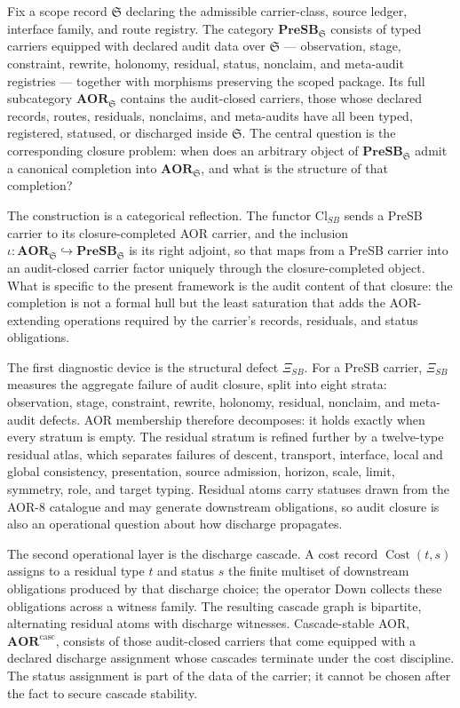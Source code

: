 \documentclass[11pt]{article}
\DeclareMathOperator{\Cost}{Cost}
\newcommand{\PreSB}{\mathbf{PreSB}}
\newcommand{\AOR}{\mathbf{AOR}}
\newcommand{\CascadeStableAOR}{\mathbf{AOR}^{\mathrm{casc}}}
\newcommand{\ClSB}{\mathrm{Cl}_{SB}}
\newcommand{\XiSB}{\Xi_{SB}}
\theoremstyle{definition}
\begin{document}
Fix a scope record \(\mathfrak S\) declaring the admissible
carrier-class, source ledger, interface family, and route registry.
The category \(\PreSB_{\mathfrak S}\) consists of typed carriers
equipped with declared audit data over \(\mathfrak S\) --- observation,
stage, constraint, rewrite, holonomy, residual, status, nonclaim, and
meta-audit registries --- together with morphisms preserving the
scoped package.  Its full subcategory \(\AOR_{\mathfrak S}\) contains
the audit-closed carriers, those whose declared records, routes,
residuals, nonclaims, and meta-audits have all been typed, registered,
statused, or discharged inside \(\mathfrak S\).  The central question
is the corresponding closure problem: when does an arbitrary object of
\(\PreSB_{\mathfrak S}\) admit a canonical completion into
\(\AOR_{\mathfrak S}\), and what is the structure of that completion?

The construction is a categorical reflection.  The functor \(\ClSB\)
sends a PreSB carrier to its closure-completed AOR carrier, and the
inclusion \(\iota:\AOR_{\mathfrak S}\hookrightarrow
\PreSB_{\mathfrak S}\) is its right adjoint, so that maps from a
PreSB carrier into an audit-closed carrier factor uniquely through the
closure-completed object.  What is specific to the present framework
is the audit content of that closure: the completion is not a formal
hull but the least saturation that adds the AOR-extending operations
required by the carrier's records, residuals, and status obligations.

The first diagnostic device is the structural defect \(\XiSB\).  For a
PreSB carrier, \(\XiSB\) measures the aggregate failure of audit
closure, split into eight strata: observation, stage, constraint,
rewrite, holonomy, residual, nonclaim, and meta-audit defects.  AOR
membership therefore decomposes: it holds exactly when every stratum
is empty.  The residual stratum is refined further by a twelve-type
residual atlas, which separates failures of descent, transport,
interface, local and global consistency, presentation, source
admission, horizon, scale, limit, symmetry, role, and target typing.
Residual atoms carry statuses drawn from the AOR-8 catalogue and may
generate downstream obligations, so audit closure is also an
operational question about how discharge propagates.

The second operational layer is the discharge cascade.  A cost record
\(\Cost(t,s)\) assigns to a residual type \(t\) and status \(s\) the
finite multiset of downstream obligations produced by that discharge
choice; the operator \(\mathrm{Down}\) collects these obligations
across a witness family.  The resulting cascade graph is bipartite,
alternating residual atoms with discharge witnesses.  Cascade-stable
AOR, \(\CascadeStableAOR\), consists of those audit-closed carriers
that come equipped with a declared discharge assignment whose cascades
terminate under the cost discipline.  The status assignment is part
of the data of the carrier; it cannot be chosen after the fact to
secure cascade stability.
\end{document}
